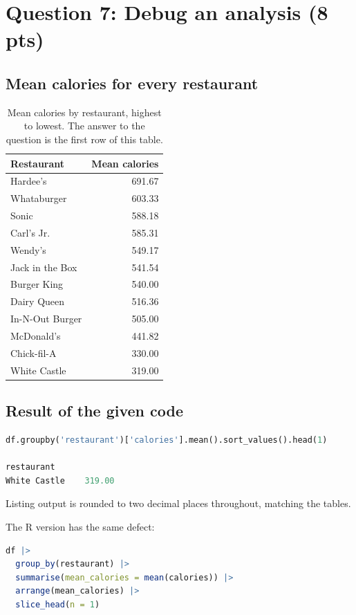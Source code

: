 \documentclass[11pt]{article}
\newcommand{\question}[2]{%
  \section*{\color{headblue}#1 \hfill \normalfont\small(#2)}}
\begin{document}
\clearpage
\question{Question 7: Debug an analysis}{8 pts}

\subsection*{Mean calories for every restaurant}
\begin{table}[H]\centering\small
\begin{tabular}{lr}
\toprule
Restaurant & Mean calories \\
\midrule
Hardee's & 691.67 \\
Whataburger & 603.33 \\
Sonic & 588.18 \\
Carl's Jr. & 585.31 \\
Wendy's & 549.17 \\
Jack in the Box & 541.54 \\
Burger King & 540.00 \\
Dairy Queen & 516.36 \\
In-N-Out Burger & 505.00 \\
McDonald's & 441.82 \\
Chick-fil-A & 330.00 \\
White Castle & 319.00 \\
\bottomrule
\end{tabular}
\caption{Mean calories by restaurant, highest to lowest. The answer to the question is the
first row of this table.}
\end{table}

\subsection*{Result of the given code}
\begin{lstlisting}[language=Python]
df.groupby('restaurant')['calories'].mean().sort_values().head(1)

restaurant
White Castle    319.00
\end{lstlisting}

\noindent Listing output is rounded to two decimal places throughout, matching the tables.

The R version has the same defect:
\begin{lstlisting}[language=R]
df |>
  group_by(restaurant) |>
  summarise(mean_calories = mean(calories)) |>
  arrange(mean_calories) |>
  slice_head(n = 1)
\end{lstlisting}
\end{document}
